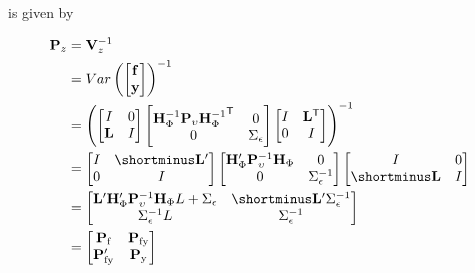 \documentclass[notitlepage,a4paper,12pt]{article}
\newcommand{\transpose}[1]{{#1}^{\sf{T}}}
\begin{document}
is given by

\begin{align*}
    \mathbf{P}_z 
    &= 
    \mathbf{V}^{-1}_z \\
    &= 
    Var\left(
    \begin{bmatrix}
        \mathbf{f} \\
        \mathbf{y}
    \end{bmatrix}
    \right)^{-1} \\
    &=  
    \left(
    \begin{bmatrix}
        I & 0 \\
        \mathbf{L} & I
    \end{bmatrix}
    \begin{bmatrix}
        \mathbf{H}^{-1}_{\Phi} \mathbf{P}_{\upsilon} \transpose{\mathbf{H}^{-1}_{\Phi}} & 0 \\
        0 & \Sigma_{\epsilon}
    \end{bmatrix} 
    \begin{bmatrix}
        I & \mathbf{L}^{\sf{T}} \\
        0 & I
    \end{bmatrix}
    \right)^{-1}\\
    &=
    \begin{bmatrix}
        I & \shortminus\mathbf{L}' \\
        0 & I
    \end{bmatrix}
    \begin{bmatrix}
        \mathbf{H}'_{\Phi} \mathbf{P}^{-1}_{\upsilon} \mathbf{H}_{\Phi} & 0 \\
        0 & \Sigma^{-1}_{\epsilon}
    \end{bmatrix} 
    \begin{bmatrix}
        I & 0 \\
        \shortminus\mathbf{L} & I 
    \end{bmatrix} \\
    &=
    \begin{bmatrix}
        \mathbf{L}' \mathbf{H}'_{\Phi} \mathbf{P}^{-1}_{\upsilon} \mathbf{H}_{\Phi} L + \Sigma_{\epsilon} & \shortminus \mathbf{L}' \Sigma^{-1}_{\epsilon} \\
        \Sigma^{-1}_{\epsilon} L & \Sigma^{-1}_{\epsilon}
    \end{bmatrix} \\
    &= 
    \begin{bmatrix}
        \mathbf{P}_{\text{f}} & \mathbf{P}_{\text{fy}} \\
        \mathbf{P}'_{\text{fy}} & \mathbf{P}_{\text{y}}  
    \end{bmatrix}
\end{align*}
\end{document}
